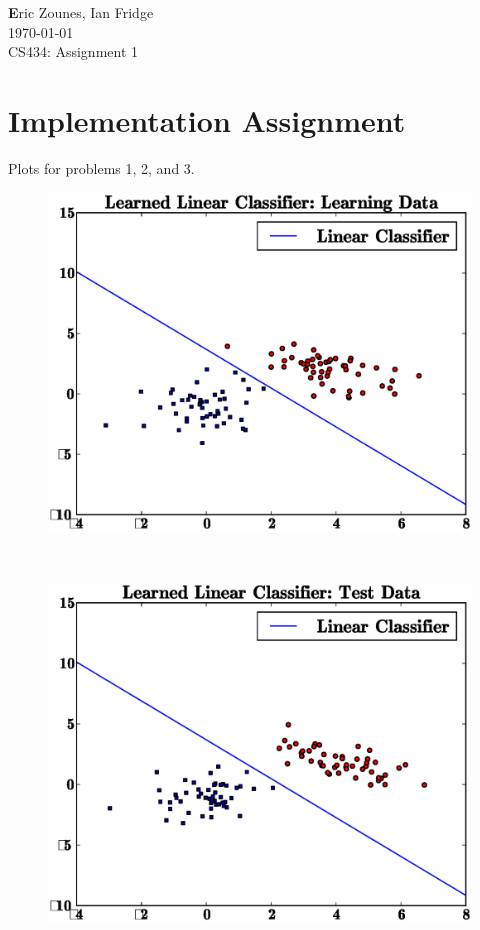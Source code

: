 \documentclass[letterpaper,10pt,titlepage]{article}
\begin{document}
\begin{flushright}
\end{flushright}
\begin{flushleft}
\textbf Eric Zounes, Ian Fridge \\
\today  \\
CS434: Assignment 1 
\end{flushleft}
\section[1]{Implementation Assignment} 
\large Plots for problems 1, 2, and 3. \\ 
\begin{figure}[th!]
\centering
\includegraphics[width=5in]{learn.eps} 
\end{figure} 
\\[5mm]
\begin{figure}[th!]
\centering
\includegraphics[width=5in]{test.eps} 
\end{figure} 
\end{document}
